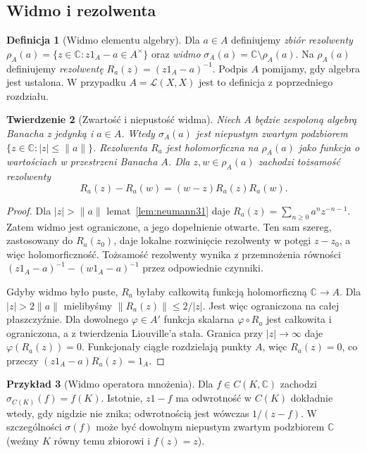 \documentclass[11pt,a4paper]{article}
\numberwithin{equation}{section}
\theoremstyle{plain}
\newtheorem{twierdzenie}{Twierdzenie}[section]
\theoremstyle{definition}
\newtheorem{definicja}[twierdzenie]{Definicja}
\newtheorem{przyklad}[twierdzenie]{Przykład}
\theoremstyle{remark}
\newcommand{\C}{\mathbb C}
\begin{document}
\subsection{Widmo i rezolwenta}

\begin{definicja}[Widmo elementu algebry]
\label{def:spectrum31}
Dla $a\in A$ definiujemy \emph{zbiór rezolwenty}
$\rho_A(a)=\{z\in\C:z1_A-a\in A^\times\}$ oraz
\emph{widmo} $\sigma_A(a)=\C\setminus\rho_A(a)$.
Na $\rho_A(a)$ definiujemy \emph{rezolwentę}
$R_a(z)=(z1_A-a)^{-1}$.
Podpis $A$ pomijamy, gdy algebra jest ustalona. W przypadku
$A=\mathcal L(X,X)$ jest to definicja z poprzedniego rozdziału.
\end{definicja}

\begin{twierdzenie}[Zwartość i niepustość widma]
\label{thm:spectrum-nonempty31}
Niech $A$ będzie zespoloną algebrą Banacha z jedynką i $a\in A$.
Wtedy $\sigma_A(a)$ jest niepustym zwartym podzbiorem
$\{z\in\C:|z|\le\|a\|\}$. Rezolwenta $R_a$ jest holomorficzna
na $\rho_A(a)$ jako funkcja o wartościach w przestrzeni Banacha $A$.
Dla $z,w\in\rho_A(a)$ zachodzi tożsamość rezolwenty
\[
 R_a(z)-R_a(w)=(w-z)R_a(z)R_a(w).
\]
\end{twierdzenie}
\begin{proof}
Dla $|z|>\|a\|$ lemat~\ref{lem:neumann31} daje
$R_a(z)=\sum_{n\ge0}a^n z^{-n-1}$. Zatem widmo jest ograniczone,
a jego dopełnienie otwarte. Ten sam szereg, zastosowany do
$R_a(z_0)$, daje lokalne rozwinięcie rezolwenty w potęgi $z-z_0$,
a więc holomorficzność. Tożsamość rezolwenty wynika z przemnożenia
równości $(z1_A-a)^{-1}-(w1_A-a)^{-1}$ przez odpowiednie czynniki.

Gdyby widmo było puste, $R_a$ byłaby całkowitą funkcją holomorficzną
$\C\to A$. Dla $|z|>2\|a\|$ mielibyśmy
$\|R_a(z)\|\le 2/|z|$. Jest więc ograniczona na całej płaszczyźnie.
Dla dowolnego $\varphi\in A'$ funkcja skalarna
$\varphi\circ R_a$ jest całkowita i ograniczona, a z twierdzenia
Liouville'a stała. Granica przy $|z|\to\infty$ daje
$\varphi(R_a(z))=0$. Funkcjonały ciągłe rozdzielają punkty $A$,
więc $R_a(z)=0$, co przeczy $(z1_A-a)R_a(z)=1_A$.
\end{proof}

\begin{przyklad}[Widmo operatora mnożenia]
\label{ex:multiplication-spectrum31}
Dla $f\in C(K,\C)$ zachodzi $\sigma_{C(K)}(f)=f(K)$.
Istotnie, $z1-f$ ma odwrotność w $C(K)$ dokładnie wtedy,
gdy nigdzie nie znika; odwrotnością jest wówczas $1/(z-f)$.
W szczególności $\sigma(f)$ może być dowolnym niepustym zwartym
podzbiorem $\C$ (weźmy $K$ równy temu zbiorowi i $f(z)=z$).
\end{przyklad}
\end{document}
